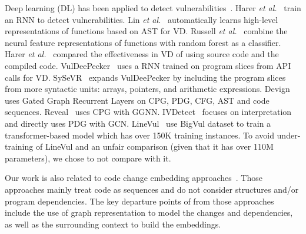 Deep learning (DL) has been applied
to detect
vulnerabilities~\cite{li2021vulnerability,zhou2019devign,li2021vuldeelocator,li2020automated,chakraborty2021deep,hin2022linevd,scandariato2014predicting,neuhaus2007predicting,shin2010evaluating,neuhaus2009beauty,yamaguchi2012generalized,yamaguchi2011vulnerability}.
Harer {\em et al.}~\cite{harer2018learning} train an RNN to detect
vulnerabilities. Lin {\em et al.}~\cite{lin2017poster} automatically
learns high-level representations of functions based on AST for
VD. Russell {\em et al.}~\cite{russell2018automated} combine the
neural feature representations of functions with random forest as a
classifier.
Harer {\em et al.}~\cite{harer2018automated} compared the
effectiveness in VD of using source code and the compiled
code. VulDeePecker~\cite{li2018vuldeepecker} uses a RNN trained on
program slices from API calls for VD. SySeVR~\cite{li2021sysevr}
expands VulDeePecker by including the program slices from more
syntactic units: arrays, pointers, and arithmetic expressions.
Devign~\cite{zhou2019devign} uses Gated Graph Recurrent Layers on CPG,
PDG, CFG, AST and code sequences. Reveal~\cite{chakraborty2020deep}
uses CPG with GGNN. IVDetect~\cite{li2021vulnerability} focuses on
interpretation and directly uses PDG with
GCN. LineVul~\cite{linevul-msr22} use BigVul dataset to train a
transformer-based model which has over 150K training instances. To
avoid under-training of LineVul and an unfair comparison (given that
it has over 110M parameters), we chose to not compare with it.

Our work is also related to code change embedding
approaches~\cite{cc2vec,commit2vec}. Those approaches mainly treat
code as sequences and do not consider structures and/or program
dependencies. The key departure points of {\tool} from those
approaches include the use of graph representation to model the
changes and dependencies, as well as the surrounding context to build
the embeddings.





